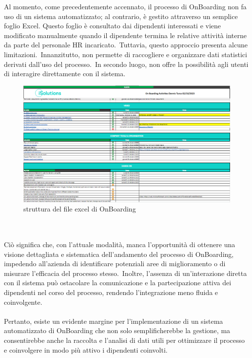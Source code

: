 %
Al momento, come precedentemente accennato, il processo di OnBoarding non fa uso di un sistema automatizzato; 
al contrario, è gestito attraverso un semplice foglio Excel. Questo foglio è consultato dai dipendenti interessati 
e viene modificato manualmente quando il dipendente termina le relative attività interne da parte del personale HR incaricato.\ 
Tuttavia, questo approccio presenta alcune limitazioni.\ 
Innanzitutto, non permette di raccogliere e organizzare dati statistici derivati dall'uso del processo.\ 
In secondo luogo, non offre la possibilità agli utenti di interagire direttamente con il sistema.
\begin{figure}[ht]
	\centering
	\includegraphics[width=\textwidth]{img/OnBoardingExcel.png}
	\caption{struttura del file excel di OnBoarding}
	\label{fig:OnBoardingExcel}
\end{figure}
\\ \\
Ciò significa che, con l'attuale modalità, manca l'opportunità di ottenere una visione dettagliata e sistematica dell'andamento del processo di OnBoarding, 
impedendo all'azienda di identificare potenziali aree di miglioramento o di misurare l'efficacia del processo stesso.\ 
Inoltre, l'assenza di un'interazione diretta con il sistema può ostacolare la comunicazione e la partecipazione attiva dei dipendenti nel corso 
del processo, rendendo l'integrazione meno fluida e coinvolgente.
\\ \\
Pertanto, esiste un evidente margine per l'implementazione di un sistema automatizzato di OnBoarding che non solo semplificherebbe 
la gestione, ma consentirebbe anche la raccolta e l'analisi di dati utili per ottimizzare il processo e coinvolgere in modo più 
attivo i dipendenti coinvolti.
